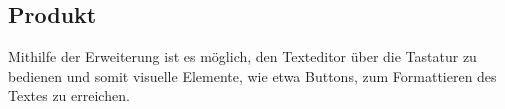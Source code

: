 \subsection{Produkt}
Mithilfe der Erweiterung ist es möglich, den Texteditor über die Tastatur zu bedienen und somit visuelle Elemente, wie etwa Buttons, zum Formattieren des Textes zu erreichen. 